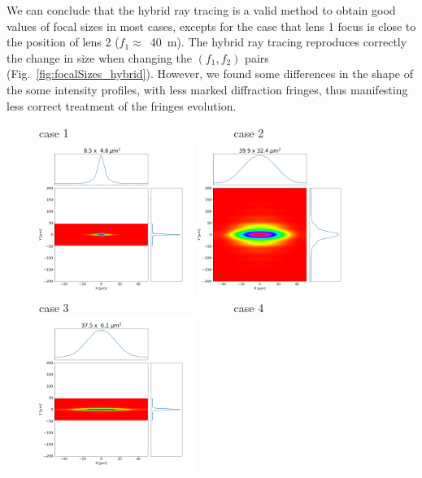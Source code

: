 \documentclass{iucr}              %
\begin{document}
We can conclude that the hybrid ray tracing is a valid method to obtain good values of focal sizes in most cases, excepts for the case that lens 1 focus is close to the position of lens 2 ($f_1 \approx $~\SI{40}{\meter}). The hybrid ray tracing reproduces correctly the change in size when changing the $(f_1,f_2)$ pairs (Fig.~\ref{fig:focalSizes_hybrid}). However, we found some differences in the shape of the some intensity profiles, with less marked diffraction fringes, thus manifesting less correct treatment of the fringes evolution. 

\newpage

\begin{figure}\label{fig:2DWofry1D}
    \centering
    case 1~~~~~~~~~~~~~~~~~~~~~~~~~~~~~case 2\\
    \includegraphics[width=0.45\textwidth]{figures/case1_wofry_ws_results.png}
    \includegraphics[width=0.45\textwidth]{figures/case2_wofry_ws_results.png}\\
    case 3~~~~~~~~~~~~~~~~~~~~~~~~~~~~~case 4\\
    \includegraphics[width=0.45\textwidth]{figures/case3_wofry_ws_results.png}

\end{figure}
\end{document}
